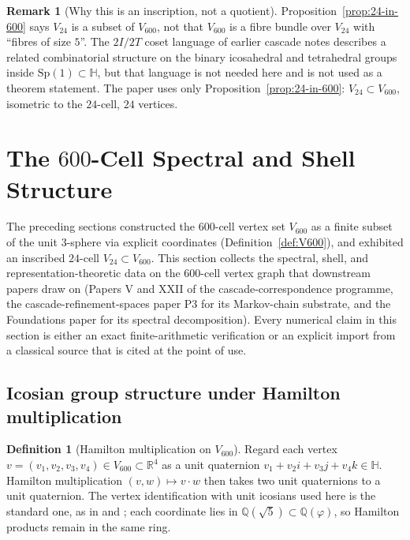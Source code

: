 \documentclass[11pt, a4paper]{amsart}
\theoremstyle{definition}
\newtheorem{definition}[theorem]{Definition}
\newtheorem{remark}[theorem]{Remark}
\newcommand{\R}{\mathbb{R}}
\newcommand{\Q}{\mathbb{Q}}
\newcommand{\HH}{\mathbb{H}}
\newcommand{\Sp}{\mathrm{Sp}}
\begin{document}
\begin{remark}[Why this is an inscription, not a quotient]
\label{rmk:inscription-not-quotient}
Proposition~\ref{prop:24-in-600} says $V_{24}$ is a subset of
$V_{600}$, not that $V_{600}$ is a fibre bundle over $V_{24}$ with
``fibres of size $5$''. The $2I/2T$ coset language of earlier
cascade notes describes a related combinatorial structure on the
binary icosahedral and tetrahedral groups inside $\Sp(1) \subset
\HH$, but that language is not needed here and is not used as a
theorem statement. The paper uses only
Proposition~\ref{prop:24-in-600}: $V_{24} \subset V_{600}$,
isometric to the $24$-cell, $24$ vertices.
\end{remark}

\section{The $600$-Cell Spectral and Shell Structure}
\label{sec:600cell-spectral}

The preceding sections constructed the $600$-cell vertex set
$V_{600}$ as a finite subset of the unit $3$-sphere via explicit
coordinates (Definition~\ref{def:V600}), and exhibited an inscribed
$24$-cell $V_{24} \subset V_{600}$. This section collects the
spectral, shell, and representation-theoretic data on the
$600$-cell vertex graph that downstream papers draw on (Papers V
and XXII of the cascade-correspondence programme, the
cascade-refinement-spaces paper P3 for its Markov-chain
substrate, and the Foundations paper for its spectral
decomposition). Every numerical claim in this section is either an
exact finite-arithmetic verification or an explicit import from a
classical source that is cited at the point of use.

\subsection{Icosian group structure under Hamilton multiplication}

\begin{definition}[Hamilton multiplication on $V_{600}$]
\label{def:ham-600}
Regard each vertex $v = (v_1, v_2, v_3, v_4) \in V_{600} \subset
\R^4$ as a unit quaternion $v_1 + v_2 i + v_3 j + v_4 k \in
\HH$. Hamilton multiplication $(v, w) \mapsto v \cdot w$ then
takes two unit quaternions to a unit quaternion. The vertex
identification with unit icosians used here is the standard one,
as in \cite[\S 3.1]{MoodyPatera} and
\cite[Ch.~8]{ConwaySloane}; each coordinate lies in
$\Q(\sqrt{5}) \subset \Q(\varphi)$, so Hamilton products remain in
the same ring.
\end{definition}
\end{document}
